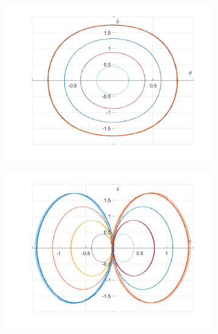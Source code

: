 \documentclass{article}
\begin{document}
	\begin{figure}[h!]
		\centering
		\begin{subfigure}[b]{0.48\linewidth}
			\includegraphics[width=\linewidth]{./SmallOscillations/S10/F5.png}
		\end{subfigure}
		\begin{subfigure}[b]{0.48\linewidth}
			\includegraphics[width=\linewidth]{./SmallOscillations/S10/F6.png}
		\end{subfigure}
	\end{figure}
	\newpage
	
\end{document}
